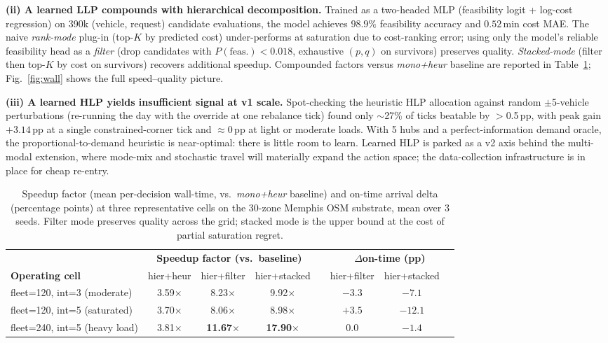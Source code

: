 \documentclass[11pt]{article}
\begin{document}
\textbf{(ii) A learned LLP compounds with hierarchical decomposition.}
Trained as a two-headed MLP (feasibility logit + log-cost regression) on
390k (vehicle, request) candidate evaluations, the model achieves
$98.9\%$ feasibility accuracy and $0.52$\,min cost MAE. The naive
\textit{rank-mode} plug-in (top-$K$ by predicted cost) under-performs at
saturation due to cost-ranking error; using only the model's reliable
feasibility head as a \textit{filter} (drop candidates with
$P(\text{feas.})<0.018$, exhaustive $(p,q)$ on survivors) preserves quality.
\textit{Stacked-mode} (filter then top-$K$ by cost on survivors) recovers
additional speedup. Compounded factors versus \textit{mono+heur} baseline
are reported in Table~\ref{tab:speedup}; Fig.~\ref{fig:wall} shows the full
speed--quality picture.

\textbf{(iii) A learned HLP yields insufficient signal at v1 scale.}
Spot-checking the heuristic HLP allocation against random
$\pm$5-vehicle perturbations (re-running the day with the
override at one rebalance tick) found only $\sim$27\% of ticks beatable
by $>$0.5\,pp, with peak gain $+3.14$\,pp at a single constrained-corner
tick and $\approx$0\,pp at light or moderate loads. With 5 hubs and a
perfect-information demand oracle, the proportional-to-demand heuristic
is near-optimal: there is little room to learn. Learned HLP is parked as a
v2 axis behind the multi-modal extension, where mode-mix and stochastic
travel will materially expand the action space; the data-collection
infrastructure is in place for cheap re-entry.

\begin{table}[ht]
\small
\centering
\caption{Speedup factor (mean per-decision wall-time, vs.\ \textit{mono+heur}
baseline) and on-time arrival delta (percentage points) at three
representative cells on the 30-zone Memphis OSM substrate, mean over
3 seeds. Filter mode preserves quality across the grid; stacked mode is
the upper bound at the cost of partial saturation regret.}
\label{tab:speedup}
\begin{tabular}{lccc cccc}
\toprule
& \multicolumn{3}{c}{\textbf{Speedup factor (vs.\ baseline)}}
& & \multicolumn{3}{c}{\textbf{$\Delta$on-time (pp)}} \\
\cmidrule(lr){2-4} \cmidrule(lr){6-8}
\textbf{Operating cell} & hier+heur & hier+filter & hier+stacked
& & hier+filter & hier+stacked \\
\midrule
fleet=120, int=3 (moderate)
& 3.59$\times$ & 8.23$\times$ & 9.92$\times$ & & $-3.3$ & $-7.1$ \\
fleet=120, int=5 (saturated)
& 3.70$\times$ & 8.06$\times$ & 8.98$\times$ & & $+3.5$ & $-12.1$ \\
fleet=240, int=5 (heavy load) %
& 3.81$\times$ & \textbf{11.67}$\times$ & \textbf{17.90}$\times$ & & $0.0$ & $-1.4$ \\
\bottomrule
\end{tabular}
\end{table}
\end{document}
